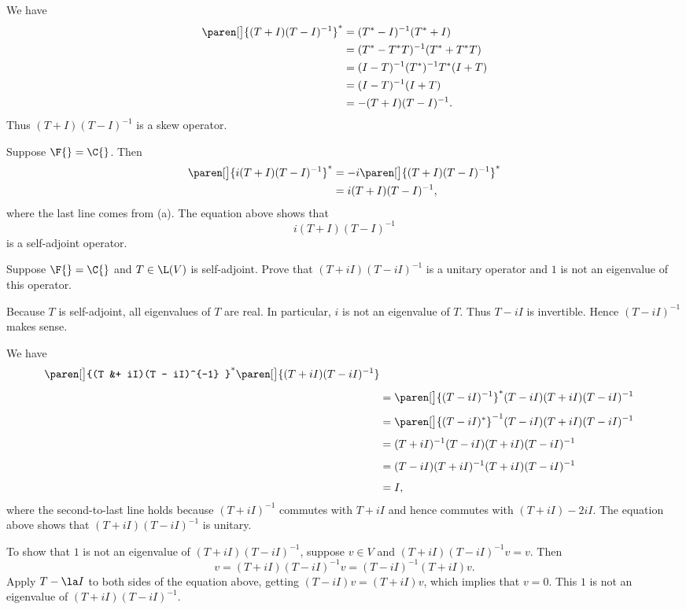 \begin{Solution}
\begin{subtheorem}
\item
We have
\begin{align*}
\paren[\big]{(T + I)(T - I)^{-1}}^* &= (T^* - I)^{-1} (T^* + I) \\
&= ( T^* - T^* T)^{-1} (T^* + T^* T) \\
&= (I - T)^{-1} (T^*)^{-1} T^* (I + T) \\
&= (I - T)^{-1} (I + T) \\
&= -(T + I)(T - I)^{-1}.
\end{align*}
Thus $(T + I)(T - I)^{-1}$ is a skew operator.

\item
Suppose $\F{} = \C{}$. Then
\begin{align*}
\paren[\big]{ i (T + I)(T - I)^{-1} }^* &= -i \paren[\big]{ (T + I)(T - I)^{-1} }^* \\
&=  i (T + I)(T - I)^{-1},
\end{align*}
where the last line comes from (a). The equation above shows that
\[
i (T + I)(T - I)^{-1}
\]
is a self-adjoint operator.
\end{subtheorem}
\end{Solution}

\exercise
Suppose $\F{} = \C{}$ and $T \in \L(V)$ is self-adjoint. Prove that $(T + iI)(T - iI)^{-1}$ is a unitary operator and $1$ is not an eigenvalue of this operator.

\begin{Solution}
Because $T$ is self-adjoint, all eigenvalues of $T$ are real. In particular, $i$ is not an eigenvalue of $T$. Thus $T - iI$ is invertible. Hence $(T - iI)^{-1}$ makes sense.

We have
\begin{align*}
\paren[\big]{(T &+ iI)(T - iI)^{-1} }^* \paren[\big]{(T + iI)(T - iI)^{-1}} \\[4bp]
&= \paren[\big]{(T - iI)^{-1}}^* (T - iI) (T+iI) (T - iI)^{-1} \\[4bp]
&= \paren[\big]{(T - iI)^*}^{-1} (T - iI) (T+iI) (T - iI)^{-1} \\[4bp]
&= (T + iI)^{-1} (T - iI) (T+iI) (T - iI)^{-1} \\[4bp]
&= (T - iI) (T + iI)^{-1} (T+iI) (T - iI)^{-1} \\[4bp]
&= I,
\end{align*}
where the second-to-last line holds because $(T + iI)^{-1}$ commutes with $T + iI$ and hence commutes with $(T + iI) - 2iI$.
The equation above shows that $(T + iI)(T - iI)^{-1}$ is unitary.

To show that $1$ is not an eigenvalue of $(T + iI)(T - iI)^{-1}$, suppose $v \in V$ and
$(T + iI)(T - iI)^{-1}v = v$. Then
\[
v = (T + iI)(T - iI)^{-1}v = (T - iI)^{-1}(T + iI)v.
\]
Apply $T - \la I$ to both sides of the equation above, getting $(T - i I)v = (T + iI) v$, which implies that $v = 0$. This $1$ is not an eigenvalue of $(T + iI)(T - iI)^{-1}$.
\end{Solution}


